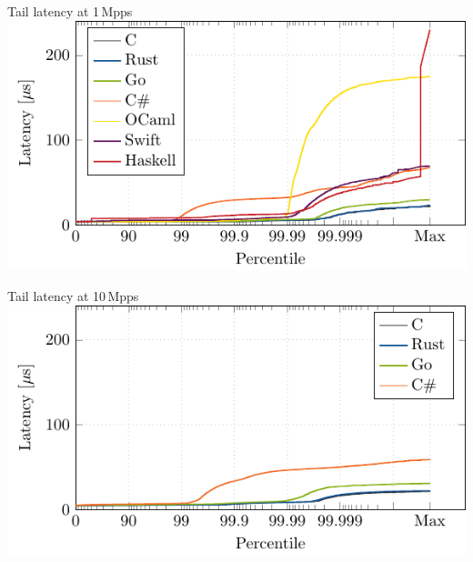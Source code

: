 \documentclass[NET,english,aspectratio=169,notitleframe]{tumbeamer}
\begin{document}
%
%
%
%

\begin{frame}{Tail latency at 1\,Mpps}
\centering\includegraphics[scale=1.1]{figures/latency-1/latency-ccdf.pdf}
\end{frame}

\begin{frame}{Tail latency at 10\,Mpps}
\centering\includegraphics[scale=1.1]{figures/latency-10/latency-ccdf.pdf}
\end{frame}
\end{document}
